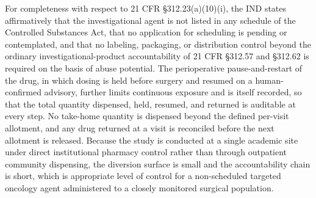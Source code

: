 For completeness with respect to 21 CFR \S 312.23(a)(10)(i), the IND states
affirmatively that the investigational agent is not listed in any schedule of the
Controlled Substances Act, that no application for scheduling is pending or
contemplated, and that no labeling, packaging, or distribution control beyond the
ordinary investigational-product accountability of 21 CFR \S 312.57 and \S 312.62 is
required on the basis of abuse potential. The perioperative pause-and-restart of the
drug, in which dosing is held before surgery and resumed on a human-confirmed
advisory, further limits continuous exposure and is itself recorded, so that the
total quantity dispensed, held, resumed, and returned is auditable at every step. No
take-home quantity is dispensed beyond the defined per-visit allotment, and any drug
returned at a visit is reconciled before the next allotment is released. Because the
study is conducted at a single academic site under direct institutional pharmacy
control rather than through outpatient community dispensing, the diversion surface is
small and the accountability chain is short, which is appropriate level of
control for a non-scheduled targeted oncology agent administered to a closely
monitored surgical population.

